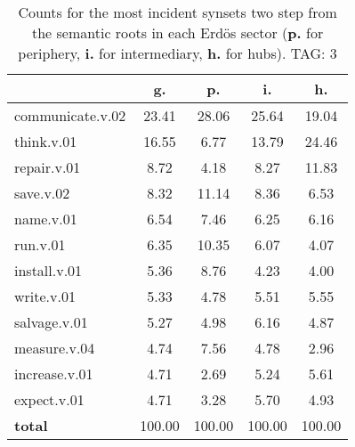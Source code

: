 \begin{table}[h!]
\begin{center}
\begin{tabular}{| l || c | c | c | c |}\hline
 & {\bf g.} & {\bf p.} & {\bf i.} & {\bf h.} \\\hline\hline
communicate.v.02 & 23.41  & 28.06  & 25.64  & 19.04 \\\hline
think.v.01 & 16.55  & 6.77  & 13.79  & 24.46 \\\hline
repair.v.01 & 8.72  & 4.18  & 8.27  & 11.83 \\\hline
save.v.02 & 8.32  & 11.14  & 8.36  & 6.53 \\\hline
name.v.01 & 6.54  & 7.46  & 6.25  & 6.16 \\\hline
run.v.01 & 6.35  & 10.35  & 6.07  & 4.07 \\\hline
install.v.01 & 5.36  & 8.76  & 4.23  & 4.00 \\\hline
write.v.01 & 5.33  & 4.78  & 5.51  & 5.55 \\\hline
salvage.v.01 & 5.27  & 4.98  & 6.16  & 4.87 \\\hline
measure.v.04 & 4.74  & 7.56  & 4.78  & 2.96 \\\hline
increase.v.01 & 4.71  & 2.69  & 5.24  & 5.61 \\\hline
expect.v.01 & 4.71  & 3.28  & 5.70  & 4.93 \\\hline\hline
{{\bf total}} & 100.00  & 100.00  & 100.00  & 100.00 \\\hline
\end{tabular}
\caption{Counts for the most incident synsets two step from the semantic roots in each Erd\"os sector ({\bf p.} for periphery, {\bf i.} for intermediary, {\bf h.} for hubs). TAG: 3}
\end{center}
\end{table}